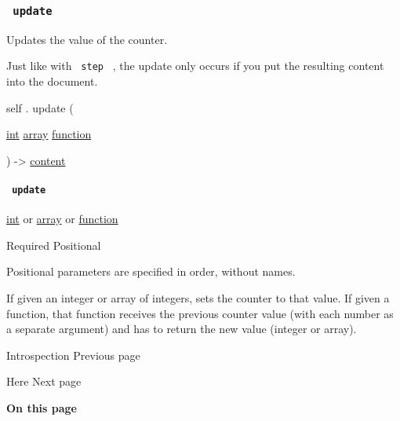 \subsubsection{\texorpdfstring{\texttt{\ update\ }}{ update }}\label{definitions-update}

Updates the value of the counter.

Just like with \texttt{\ step\ } , the update only occurs if you put the
resulting content into the document.

self { . } { update } (

{ \href{/docs/reference/foundations/int/}{int}
\href{/docs/reference/foundations/array/}{array}
\href{/docs/reference/foundations/function/}{function} }

) -\textgreater{} \href{/docs/reference/foundations/content/}{content}

\paragraph{\texorpdfstring{\texttt{\ update\ }}{ update }}\label{definitions-update-update}

\href{/docs/reference/foundations/int/}{int} {or}
\href{/docs/reference/foundations/array/}{array} {or}
\href{/docs/reference/foundations/function/}{function}

{Required} {{ Positional }}

\label{definitions-update-update-positional-tooltip}
Positional parameters are specified in order, without names.

If given an integer or array of integers, sets the counter to that
value. If given a function, that function receives the previous counter
value (with each number as a separate argument) and has to return the
new value (integer or array).

\href{/docs/reference/introspection/}{\pandocbounded{}}

{ Introspection } { Previous page }

\href{/docs/reference/introspection/here/}{\pandocbounded{}}

{ Here } { Next page }

\textbf{On this page}

